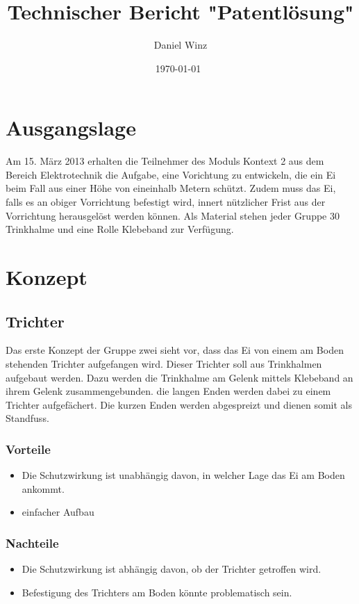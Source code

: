 \documentclass[a4paper,10pt,fleqn]{article}
\title{Technischer Bericht "Patentlösung"}
\author{Daniel Winz}
\date{\today~\dtc}
\begin{document}
\maketitle

\tableofcontents

\listoffigures


{}

\newpage

% 
\section{Ausgangslage}
Am 15. März 2013 erhalten die Teilnehmer des Moduls Kontext 2 aus dem Bereich 
Elektrotechnik die Aufgabe, eine Vorichtung zu entwickeln, die ein Ei beim Fall 
aus einer Höhe von eineinhalb Metern schützt. Zudem muss das Ei, falls es an 
obiger Vorrichtung befestigt wird, innert nützlicher Frist aus der Vorrichtung 
herausgelöst werden können. Als Material stehen jeder Gruppe 30 Trinkhalme und 
eine Rolle Klebeband zur Verfügung. 
\cite{barmet:aufgabenstellung}

\section{Konzept}
\subsection{Trichter}
Das erste Konzept der Gruppe zwei sieht vor, dass das Ei von einem am Boden 
stehenden Trichter aufgefangen wird. Dieser Trichter soll aus Trinkhalmen 
aufgebaut werden. Dazu werden die Trinkhalme am Gelenk mittels Klebeband an 
ihrem Gelenk zusammengebunden. die langen Enden werden dabei zu einem Trichter 
aufgefächert. Die kurzen Enden werden abgespreizt und dienen somit als 
Standfuss. 

\subsubsection*{Vorteile}
\begin{itemize}
  \item Die Schutzwirkung ist unabhängig davon, in welcher Lage das Ei am Boden 
        ankommt. 
  \item einfacher Aufbau
\end{itemize}

\subsubsection*{Nachteile}
\begin{itemize}
  \item Die Schutzwirkung ist abhängig davon, ob der Trichter getroffen wird. 
  \item Befestigung des Trichters am Boden könnte problematisch sein. 
\end{itemize}
\end{document}
